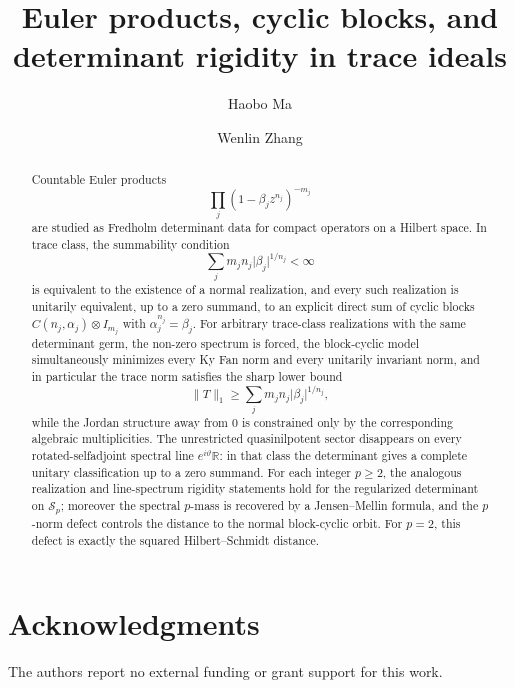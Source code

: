 \documentclass[11pt,a4paper]{amsart}
\title[Euler products and determinant rigidity]{Euler products, cyclic blocks, and determinant rigidity in trace ideals}
\author{Haobo Ma}
\author{Wenlin Zhang}
\date{}
\theoremstyle{plain}
\theoremstyle{definition}
\theoremstyle{remark}
\numberwithin{equation}{section}
\newcommand{\RR}{\mathbb{R}}
\newcommand{\abs}[1]{\lvert #1 \rvert}
\begin{document}
\begin{abstract}
  Countable Euler products
  \[
    \prod_j (1-\beta_j z^{n_j})^{-m_j}
  \]
  are studied as Fredholm determinant data for compact operators on a
  Hilbert space.
  In trace class, the summability condition
  \[
    \sum_j m_j n_j\abs{\beta_j}^{1/n_j}<\infty
  \]
  is equivalent to the existence of a normal realization, and every such
  realization is unitarily equivalent, up to a zero summand, to an
  explicit direct sum of cyclic blocks
  \(
    C(n_j,\alpha_j)\otimes I_{m_j}
  \)
  with \(\alpha_j^{n_j}=\beta_j\). For arbitrary trace-class
  realizations with the same determinant germ, the non-zero spectrum is
  forced, the block-cyclic model simultaneously minimizes every Ky Fan
  norm and every unitarily invariant norm, and in particular the trace
  norm satisfies the sharp lower bound
  \[
    \|T\|_1\ge \sum_j m_j n_j\abs{\beta_j}^{1/n_j},
  \]
  while the Jordan structure away from \(0\) is constrained only by the
  corresponding algebraic multiplicities. The unrestricted
  quasinilpotent sector disappears on every rotated-selfadjoint spectral
  line \(e^{i\vartheta}\RR\): in that class the determinant gives a
  complete unitary classification up to a zero summand. For each
  integer \(p\ge 2\), the analogous realization and line-spectrum
  rigidity statements hold for the regularized determinant on
  \(\mathcal S_p\); moreover the spectral \(p\)-mass is recovered by a
  Jensen--Mellin formula, and the \(p\)-norm defect controls the
  distance to the normal block-cyclic orbit. For \(p=2\), this defect
  is exactly the squared Hilbert--Schmidt distance.
\end{abstract}


\maketitle






\section*{Acknowledgments}
The authors report no external funding or grant support for this work.

\appendix





\end{document}
